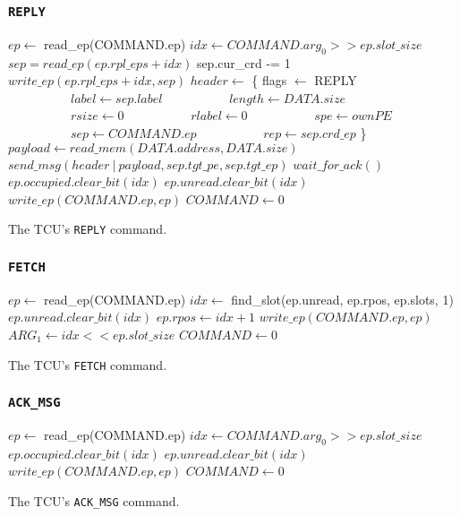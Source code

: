 \documentclass[a4paper,11pt,draft]{article}
\begin{document}
\subsubsection{\texttt{REPLY}}

\begin{algorithm}[H]
    $ep \gets$ read\_ep(COMMAND.ep)\;
    \BlankLine
    $idx \gets COMMAND.arg_0 >> ep.slot\_size$\;
    $sep = read\_ep(ep.rpl\_eps + idx)$\;
    \BlankLine
    sep.cur\_crd -= 1\;
    $write\_ep(ep.rpl\_eps + idx, sep)$\;
    \BlankLine
    $header \gets$ \{ flags $\gets$ REPLY\;
    $\quad\quad\quad\quad\quad label \gets sep.label$\;
    $\quad\quad\quad\quad\quad length \gets DATA.size$\;
    $\quad\quad\quad\quad\quad rsize \gets 0$\;
    $\quad\quad\quad\quad\quad rlabel \gets 0$\;
    $\quad\quad\quad\quad\quad spe \gets ownPE$\;
    $\quad\quad\quad\quad\quad sep \gets COMMAND.ep$\;
    $\quad\quad\quad\quad\quad rep \gets sep.crd\_ep$ \}\;
    $payload \gets read\_mem(DATA.address, DATA.size)$\;
    $send\_msg(header\ |\ payload, sep.tgt\_pe, sep.tgt\_ep)$\;
    $wait\_for\_ack()$\;
    \BlankLine
    $ep.occupied.clear\_bit(idx)$\;
    $ep.unread.clear\_bit(idx)$\;
    $write\_ep(COMMAND.ep, ep)$\;
    \BlankLine
    $COMMAND \gets 0$\;
    \caption{The TCU's \texttt{REPLY} command.}
\end{algorithm}

\subsubsection{\texttt{FETCH}}

\begin{algorithm}[H]
    $ep \gets$ read\_ep(COMMAND.ep)\;
    \BlankLine
    $idx \gets$ find\_slot(ep.unread, ep.rpos, ep.slots, 1)\;
    $ep.unread.clear\_bit(idx)$\;
    $ep.rpos \gets idx + 1$\;
    $write\_ep(COMMAND.ep, ep)$\;
    \BlankLine
    $ARG_1 \gets idx << ep.slot\_size$\;
    $COMMAND \gets 0$\;
    \caption{The TCU's \texttt{FETCH} command.}
\end{algorithm}

\subsubsection{\texttt{ACK\_MSG}}

\begin{algorithm}[H]
    $ep \gets$ read\_ep(COMMAND.ep)\;
    \BlankLine
    $idx \gets COMMAND.arg_0 >> ep.slot\_size$\;
    $ep.occupied.clear\_bit(idx)$\;
    $ep.unread.clear\_bit(idx)$\;
    $write\_ep(COMMAND.ep, ep)$\;
    \BlankLine
    \BlankLine
    $COMMAND \gets 0$\;
    \caption{The TCU's \texttt{ACK\_MSG} command.}
\end{algorithm}
\end{document}
